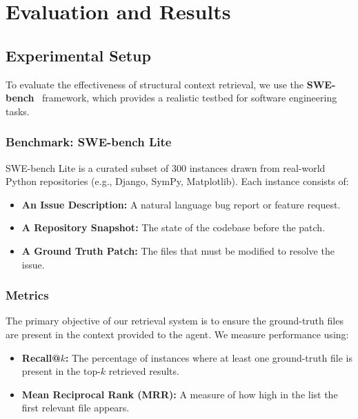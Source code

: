 \chapter{Evaluation and Results}
\label{chap:evaluation}

\section{Experimental Setup}
\label{sec:setup}

To evaluate the effectiveness of structural context retrieval, we use the \textbf{SWE-bench}~\cite{yang2024swebench} framework, which provides a realistic testbed for software engineering tasks.

\subsection{Benchmark: SWE-bench Lite}
SWE-bench Lite is a curated subset of 300 instances drawn from real-world Python repositories (e.g., Django, SymPy, Matplotlib). Each instance consists of:
\begin{itemize}
    \item \textbf{An Issue Description:} A natural language bug report or feature request.
    \item \textbf{A Repository Snapshot:} The state of the codebase before the patch.
    \item \textbf{A Ground Truth Patch:} The files that must be modified to resolve the issue.
\end{itemize}

\subsection{Metrics}
The primary objective of our retrieval system is to ensure the ground-truth files are present in the context provided to the agent. We measure performance using:
\begin{itemize}
    \item \textbf{Recall@$k$:} The percentage of instances where at least one ground-truth file is present in the top-$k$ retrieved results.
    \item \textbf{Mean Reciprocal Rank (MRR):} A measure of how high in the list the first relevant file appears.
\end{itemize}

